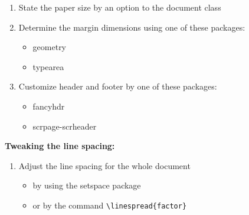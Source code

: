 \documentclass{article}
\begin{document}
\begin{enumerate}
  \item State the paper size by an option to the
        document class
  \item Determine the margin dimensions using one of
        these packages:
    \begin{itemize}
    \item geometry
    \item typearea
  \end{itemize}
  \item Customize header and footer by one of these
        packages:
  \begin{itemize}
    \item fancyhdr
    \item scrpage-scrheader
  \end{itemize}
\end{enumerate}
\noindent\textbf{Tweaking the line spacing:}
\begin{enumerate}[resume*]
  \item Adjust the line spacing for the whole document
  \begin{itemize}
    \item by using the setspace package
    \item or by the command \verb|\linespread{factor}|
  \end{itemize}
\end{enumerate}
\end{document}
